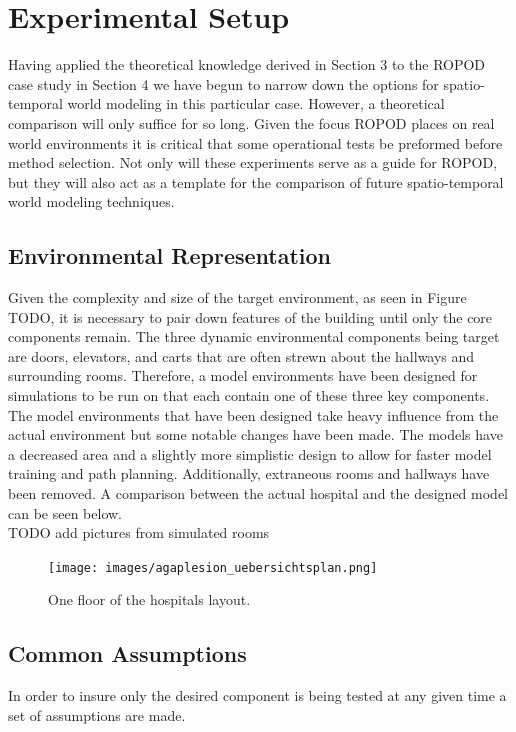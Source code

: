 
\chapter{Experimental Setup}

Having applied the theoretical knowledge derived in Section 3 to the ROPOD case
study in Section 4 we have begun to narrow down the options for spatio-temporal
world modeling in this particular case. However, a theoretical comparison will
only suffice for so long. Given the focus ROPOD places on real world
environments it is critical that some operational tests be preformed before
method selection. Not only will these experiments serve as a guide for ROPOD,
but they will also act as a template for the comparison of future
spatio-temporal world modeling techniques.


\section{ Environmental Representation}

Given the complexity and size of the target environment, as seen in Figure
TODO, it is necessary to pair down features of the building
until only the core components remain. The three dynamic environmental
components being target are doors, elevators, and carts that are often strewn
about the hallways and surrounding rooms. Therefore, a model environments have
been designed for simulations to be run on that each contain one of these three key
components. The model environments that have been designed take heavy
influence from the actual environment but some notable changes have been made.
The models have a decreased area and a slightly more simplistic design to
allow for faster model training and path planning. Additionally, extraneous
rooms and hallways have been removed. A comparison between the actual hospital
and the designed model can be seen below.\\TODO add pictures from simulated rooms

\begin{figure}[!htb]
  \centering
  \texttt{[image: images/agaplesion\_uebersichtsplan.png]}
  \caption{One floor of the hospitals layout.}
  \label{figure:hospital_overview}
\end{figure}

\section{ Common Assumptions }
In order to insure only the desired component is being tested at any given
time a set of assumptions are made.

